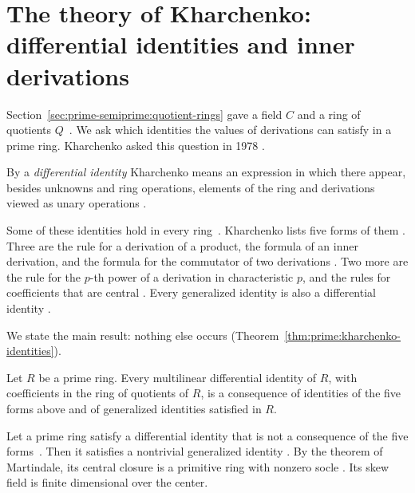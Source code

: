 \section{The theory of Kharchenko: differential identities and inner derivations}\label{sec:prime-semiprime:kharchenko}

Section~\ref{sec:prime-semiprime:quotient-rings} gave a field $C$ and a ring
of quotients $Q$~\cite[p.~155]{Kharchenko1978}. We ask which identities the values of derivations can
satisfy in a prime ring. Kharchenko asked this question in 1978
\cite[p.~155]{Kharchenko1978}.

By a \emph{differential identity} Kharchenko means an expression in which
there appear, besides unknowns and ring operations, elements of the ring and
derivations viewed as unary operations \cite[p.~155]{Kharchenko1978}.

Some of these identities hold in every ring~\cite[p.~155]{Kharchenko1978}. Kharchenko lists five forms of
them \cite[p.~155]{Kharchenko1978}. Three are the rule for a derivation of a
product, the formula of an inner derivation, and the formula for the
commutator of two derivations \cite[p.~155]{Kharchenko1978}. Two more are the
rule for the $p$-th power of a derivation in characteristic $p$, and the rules
for coefficients that are central \cite[p.~155]{Kharchenko1978}. Every
generalized identity is also a differential identity
\cite[p.~155]{Kharchenko1978}.

We state the main result: nothing else occurs
(Theorem~\ref{thm:prime:kharchenko-identities}).

\begin{theorem}\label{thm:prime:kharchenko-identities}
Let $R$ be a prime ring. Every multilinear differential identity of $R$, with
coefficients in the ring of quotients of $R$, is a consequence of identities of the
five forms above and of generalized identities satisfied in $R$.
\end{theorem}

Let a prime ring satisfy a differential identity that is not a consequence of
the five forms~\cite[p.~155]{Kharchenko1978}. Then it satisfies a nontrivial generalized identity
\cite[p.~155]{Kharchenko1978}. By the theorem of Martindale, its central
closure is a primitive ring with nonzero socle \cite[p.~155]{Kharchenko1978}.
Its skew field is finite dimensional over the center.

